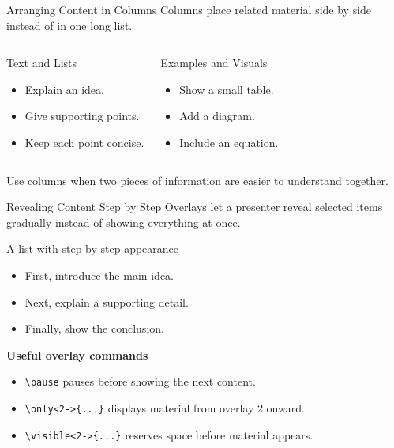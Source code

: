 \documentclass[11pt,aspectratio=43]{beamer}
\begin{document}
\begin{frame}{Arranging Content in Columns}
  Columns place related material side by side instead of in one long list.
  \vspace{0.18cm}
  \begin{columns}[T,onlytextwidth]
      \begin{block}{Text and Lists}
        \begin{itemize}
          \item Explain an idea.
          \item Give supporting points.
          \item Keep each point concise.
        \end{itemize}
      \end{block}
      \begin{block}{Examples and Visuals}
        \begin{itemize}
          \item Show a small table.
          \item Add a diagram.
          \item Include an equation.
        \end{itemize}
      \end{block}
  \end{columns}
  \vspace{0.10cm}
  \small Use columns when two pieces of information are easier to understand together.
\end{frame}

\begin{frame}{Revealing Content Step by Step}
  Overlays let a presenter reveal selected items gradually instead of showing everything at once.
  \vspace{0.12cm}
  \begin{block}{A list with step-by-step appearance}
    \begin{itemize}
      \item<1-> First, introduce the main idea.
      \item<2-> Next, explain a supporting detail.
      \item<3-> Finally, show the conclusion.
    \end{itemize}
  \end{block}
  \textbf{Useful overlay commands}
  \begin{itemize}
    \item \texttt{\textbackslash pause} pauses before showing the next content.
    \item \texttt{\textbackslash only<2->\{...\}} displays material from overlay 2 onward.
    \item \texttt{\textbackslash visible<2->\{...\}} reserves space before material appears.
  \end{itemize}
\end{frame}
\end{document}
